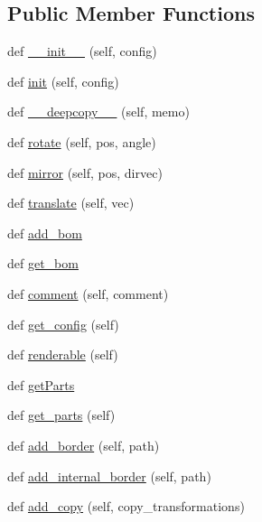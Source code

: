 \subsection*{Public Member Functions}
\begin{DoxyCompactItemize}
\item 
def \hyperlink{classpath_1_1_part_ad303df059ccf8ea977b9ba099f1f17a9}{\+\_\+\+\_\+init\+\_\+\+\_\+} (self, config)
\item 
def \hyperlink{classpath_1_1_part_a78ba05bb5f29eee1830388be6d15af98}{init} (self, config)
\item 
def \hyperlink{classpath_1_1_part_a01c7a739dee22053cee9f0b28348f1a3}{\+\_\+\+\_\+deepcopy\+\_\+\+\_\+} (self, memo)
\item 
def \hyperlink{classpath_1_1_part_a70560f4969089436589b608259ee2ca1}{rotate} (self, pos, angle)
\item 
def \hyperlink{classpath_1_1_part_a3e0f8f43f26a761a02616e2a2bc735e1}{mirror} (self, pos, dirvec)
\item 
def \hyperlink{classpath_1_1_part_a27d0b520d21955962d578c55227bcff8}{translate} (self, vec)
\item 
def \hyperlink{classpath_1_1_part_abb8f248470b535ae0449e1a47f912506}{add\+\_\+bom}
\item 
def \hyperlink{classpath_1_1_part_aa3ab823fc2a4baeaa97300d310d3b8eb}{get\+\_\+bom}
\item 
def \hyperlink{classpath_1_1_part_aaa7dce569975af8da512ecba96f67538}{comment} (self, comment)
\item 
def \hyperlink{classpath_1_1_part_ab6fccbe6e3b1b965e8fbfa0a64e33b91}{get\+\_\+config} (self)
\item 
def \hyperlink{classpath_1_1_part_ad5f9f5edfa6d110a4de203c109223ede}{renderable} (self)
\item 
def \hyperlink{classpath_1_1_part_a6923ae4219b5cbd4bc87e22c09da14fc}{get\+Parts}
\item 
def \hyperlink{classpath_1_1_part_a55bbf4c0ea6fbf7f70c4470929ee4b26}{get\+\_\+parts} (self)
\item 
def \hyperlink{classpath_1_1_part_a4476c8b030ebcf9c7df00e6a7aa9214c}{add\+\_\+border} (self, path)
\item 
def \hyperlink{classpath_1_1_part_af7a16e2949b4fb42f61efa17c29d9b56}{add\+\_\+internal\+\_\+border} (self, path)
\item 
def \hyperlink{classpath_1_1_part_a397ea5a1af4d031e7f1fb4ceac654de5}{add\+\_\+copy} (self, copy\+\_\+transformations)
\item 

\end{DoxyCompactItemize}

